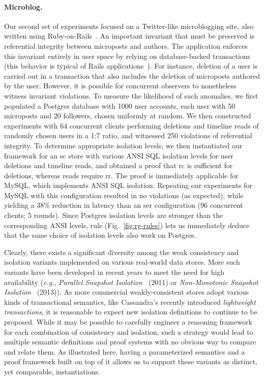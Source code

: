 \paragraph{Microblog.} Our second set of experiments focused on a Twitter-like microblogging
site, also written using Ruby-on-Rails~\cite{railsbook}.  An important
invariant that must be preserved is referential
integrity between microposts and authors. The application enforces
this invariant entirely in user space by relying on database-backed
transactions (this behavior is typical of Rails
applications~\cite{bailisferal}).  For instance, deletion of a user is
carried out in a transaction that also includes the deletion of
microposts authored by the user.  However, it is possible for concurrent observers 
to nonetheless witness invariant violations. To measure
the likelihood of such anomalies, we first populated a Postgres
database with 1000 user accounts, each user with 50 microposts and 20
followers, chosen uniformly at random. We then constructed experiments
with 64 concurrent clients performing deletions and timeline reads of
randomly chosen users in a 1:7 ratio, and witnessed 250 violations of
referential integrity. To determine appropriate isolation levels, we
then instantiated our framework for an {\sc sc} store with various
ANSI SQL isolation levels for user deletions and timeline reads, and
obtained a proof that {\sc rc} is sufficient for deletions, whereas
reads require {\sc rr}. The proof is immediately applicable for MySQL,
which implements ANSI SQL isolation. Repeating our experiments
for MySQL with this configuration resulted in no violations (as
expected), while yielding a 38\% reduction in latency than an {\sc
  ser} configuration (96 concurrent clients; 5 rounds).  Since
Postgres isolation levels are stronger than the corresponding ANSI
levels,  rule (Fig.~\ref{fig:rg-rules}) lets us
immediately deduce that the same choice of isolation levels also work
on Postgres.

Clearly, there exists a significant diversity among the weak
consistency and isolation variants implemented on various real-world
data stores. More such variants have been developed in recent years to
meet the need for high availability (\emph{e.g.}, \emph{Parallel
  Snapshot Isolation}~\cite{psi} (2011) or \emph{Non-Monotonic
  Snapshot Isolation}~\cite{nmsi} (2013)).  As more commercial
weakly-consistent stores adopt various kinds of transactional
semantics, like Cassandra's recently introduced \emph{lightweight
  transactions}, it is reasonable to expect new isolation
definitions to continue to be proposed.  While it may be possible to
carefully engineer a reasoning framework for each combination of
consistency and isolation, such a strategy would lead to multiple
semantic definitions and proof systems with no obvious way to compare
and relate them. As illustrated here, having a parameterized semantics
and a proof framework built on top of it allows us to support these
variants as distinct, yet comparable, instantiations.





